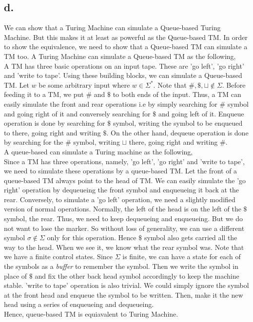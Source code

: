 \documentclass[12pt]{article}
\begin{document}
\subsection*{d.}
We can show that a Turing Machine can simulate a Queue-based Turing Machine. But this makes it at least as powerful as the Queue-based TM. In order to show the equivalence, we need to show that a Queue-based TM can simulate a TM too.
A Turing Machine can simulate a Queue-based TM as the following,\\
A TM has three basic operations on an input tape. These are 'go left', 'go right' and 'write to tape'. Using these building blocks, we can simulate a Queue-based TM. Let $w$ be some arbitrary input where $w\in \Sigma^*$. Note that $\#,\$, \sqcup\notin \Sigma$. Before feeding it to a TM, we put $\#$ and $\$$ to both ends of the input. Thus, a TM can easily simulate the front and rear operations i.e by simply searching for $\#$ symbol and going right of it and conversely searching for $\$$ and going left of it. Enqueue operation is done by searching for $\$$ symbol, writing the symbol to be enqueued to there, going right and writing $\$$. On the other hand, dequeue operation is done by searching for the $\#$ symbol, writing $\sqcup$ there, going right and writing $\#$.\\
A queue-based can simulate a Turing machine as the following,\\
Since a TM has three operations, namely, 'go left', 'go right' and 'write to tape', we need to simulate these operations by a queue-based TM. Let the front of a queue-based TM always point to the head  of TM. We can easily simulate the 'go right' operation by dequeueing the front symbol and enqueueing it back at the rear. Conversely, to simulate a 'go left' operation, we need a slightly modified version of normal operations. Normally, the left of the head is on the left of the $\$$ symbol, the rear. Thus, we need to keep dequeueing and enqueueing. But we do not want to lose the marker. So without loss of generality, we can use a different symbol $\sigma\notin \Sigma$ only for this operation. Hence $\$$ symbol also gets carried all the way to the head. When we see it, we know what the rear symbol was. Note that we have a finite control states. Since $\Sigma$ is finite, we can have a state for each of the symbols as a \textit{buffer} to remember the symbol. Then we write the symbol in place of $\$$ and fix the other back head symbol accordingly to keep the machine stable. 'write to tape' operation is also trivial. We could simply ignore the symbol at the front head and enqueue the symbol to be written. Then, make it the new head using a series of enqueueing and dequeueing.\\
Hence, queue-based TM is equiavalent to Turing Machine.
\end{document}
